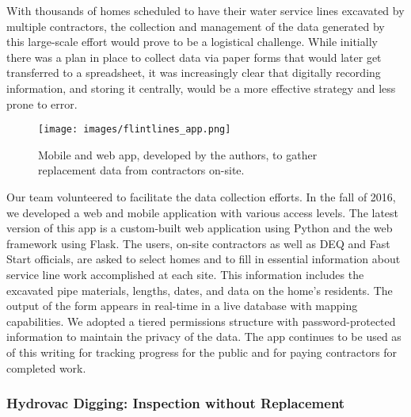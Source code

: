 \documentclass[sigconf]{acmart}
\begin{document}
With thousands of homes scheduled to have their water service lines excavated by multiple contractors, the collection and management of the data generated by this large-scale effort would prove to be a logistical challenge.  While initially there was a plan in place to collect data via paper forms that would later get transferred to a spreadsheet, it was increasingly clear that digitally recording information, and storing it centrally, would be a more effective strategy and less prone to error.

 \begin{figure}[!ht]
 \begin{center}
 \texttt{[image: images/flintlines\_app.png]}
     \caption{Mobile and web app, developed by the authors, to gather replacement data from contractors on-site.}
     \label{fig:app_sl_collection}
 \end{center}
\end{figure}

Our team volunteered to facilitate the data collection efforts. In the fall of 2016, we developed a web and mobile application with various access levels. The latest version of this app is a custom-built web application using Python and the web framework using Flask. The users, on-site contractors as well as DEQ and Fast Start officials, are asked to select homes and to fill in essential information about service line work accomplished at each site. This information includes the excavated pipe materials, lengths, dates, and data on the home's residents. The output of the form appears in real-time in a live database with mapping capabilities. We adopted a tiered permissions structure with password-protected information to maintain the privacy of the data. The app continues to be used as of this writing for tracking progress for the public and for paying contractors for completed work.

\subsubsection{Hydrovac Digging: Inspection without Replacement}
\label{sec:unbiased_data_and_the_hydrovac_pilot}
\end{document}
